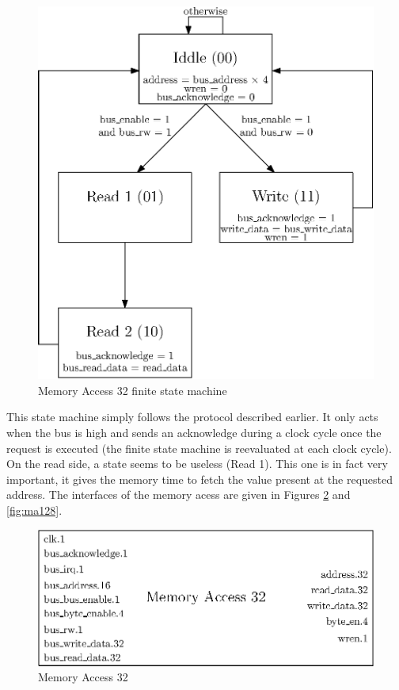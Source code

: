 \begin{figure}[ht!]
    \center
    \includegraphics[scale=0.8]{"Chapter5-MAU_CTRLU/res/mau_fsm"}
    \caption{Memory Access 32 finite state machine}
    \label{fig:ma_fsm}
\end{figure}

This state machine simply follows the protocol described earlier. It only acts when the bus is high 
and sends an acknowledge during a clock cycle once the request is executed (the finite state machine 
is reevaluated at each clock cycle). On the read side, a state seems to be useless (Read 1). This 
one is in fact very important, it gives the memory time to fetch the value present at the requested 
address. The interfaces of the memory acess are given in Figures \ref{fig:ma32} and \ref{fig:ma128}.

\begin{figure}[ht!]
    \center
    \includegraphics[scale=0.8]{"Chapter5-MAU_CTRLU/res/memory_access_32"}
    \caption{Memory Access 32}
    \label{fig:ma32}
\end{figure}

